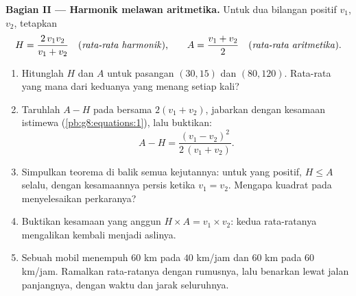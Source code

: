 \begin{problem}
\medskip
\noindent\textbf{Bagian II --- Harmonik melawan aritmetika.}
Untuk dua bilangan positif $v_1$, $v_2$, tetapkan
\[
H = \frac{2\, v_1 v_2}{v_1 + v_2}
\quad\text{(\emph{rata-rata harmonik}),}
\qquad
A = \frac{v_1 + v_2}{2}
\quad\text{(\emph{rata-rata aritmetika}).}
\]
\begin{enumerate}[resume]
  \item Hitunglah $H$ dan $A$ untuk pasangan $(30, 15)$ dan
        $(80, 120)$. Rata-rata yang mana dari keduanya yang menang
        setiap kali?
  \item Taruhlah $A - H$ pada  bersama $2(v_1 + v_2)$,
        jabarkan  dengan kesamaan istimewa
        (\cref{pb:g8:equations:1}), lalu buktikan:
        \[
        A - H = \frac{(v_1 - v_2)^2}{2\,(v_1 + v_2)} .
        \]
  \item Simpulkan teorema di balik semua kejutannya: untuk 
        yang positif, $H \leq A$ selalu, dengan kesamaannya persis
        ketika $v_1 = v_2$. Mengapa kuadrat pada 
        menyelesaikan perkaranya?
  \item Buktikan kesamaan yang anggun $H \times A = v_1 \times v_2$:
        kedua rata-ratanya mengalikan kembali menjadi 
        aslinya.
  \item Sebuah mobil menempuh $60$ km pada $40$ km/jam dan $60$ km
        pada $60$ km/jam. Ramalkan  rata-ratanya dengan
        rumusnya, lalu benarkan lewat jalan panjangnya, dengan waktu
        dan jarak seluruhnya.
\end{enumerate}


\end{problem}

